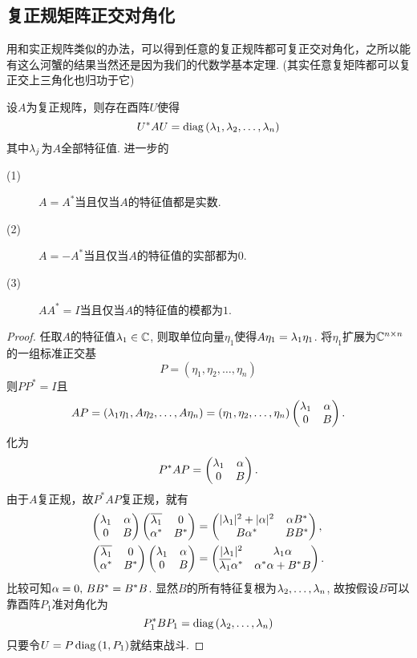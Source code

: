 \subsection{复正规矩阵正交对角化}
用和实正规阵类似的办法，可以得到任意的复正规阵都可复正交对角化，之所以能有这么河蟹的结果当然还是因为我们的代数学基本定理. (其实任意复矩阵都可以复正交上三角化也归功于它)
\begin{thm}
	设$A$为复正规阵，则存在酉阵$U$使得
	\[U^* AU=\operatorname*{diag\,}(\lambda_1,\lambda_2,\dots,\lambda_n)\]
	其中$\lambda_j$为$A$全部特征值. 进一步的
	\begin{description}
	\item[(1)] $A=A^*$当且仅当$A$的特征值都是实数.
	\item[(2)] $A=-A^*$当且仅当$A$的特征值的实部都为$0$.
	\item[(3)] $AA^*=I$当且仅当$A$的特征值的模都为$1$.
	\end{description}
\end{thm}
\begin{proof}
	任取$A$的特征值$\lambda_1\in\mathbb{C}$, 则取单位向量$\eta_1$使得$A\eta_1=\lambda_1 \eta_1$. 将$\eta_1$扩展为$\mathbb{C}^{n\times n}$的一组标准正交基
	\[P=(\eta_1,\eta_2,\dots,\eta_n)\]
	则$PP^*=I$且
	\[AP=(\lambda_1\eta_1,A\eta_2,\dots,A\eta_n)=(\eta_1,\eta_2,\dots,\eta_n)
	\begin{pmatrix} \lambda_1 & \alpha\\ 0 & B\end{pmatrix}.\]
	化为
	\[
	P^* AP=\begin{pmatrix} \lambda_1 & \alpha\\ 0 & B\end{pmatrix}.
	\]
	由于$A$复正规，故$P^* AP$复正规，就有
	\begin{align*}
	\begin{pmatrix} \lambda_1 & \alpha\\ 0 & B\end{pmatrix}
	\begin{pmatrix} \overline{\lambda_1} & 0\\ \alpha^* & B^*\end{pmatrix}&=
		\begin{pmatrix} |\lambda_1|^2+|\alpha|^2 & \alpha B^*\\ B\alpha^* & BB^*\end{pmatrix},\\
	\begin{pmatrix} \overline{\lambda_1} & 0\\ \alpha^* & B^*\end{pmatrix}
	\begin{pmatrix} \lambda_1 & \alpha\\ 0 & B\end{pmatrix}&=
	\begin{pmatrix} |\lambda_1|^2 & \lambda_1\alpha\\ \overline{\lambda_1}\alpha^* & \alpha^*\alpha+B^* B\end{pmatrix}.
	\end{align*}
	比较可知$\alpha=0,\, BB^*=B^*B$. 显然$B$的所有特征复根为$\lambda_{2},\dots,\lambda_{n}$,
	故按假设$B$可以靠酉阵$P_1$准对角化为
	\[P_1^* B P_1=\operatorname*{diag\,}(\lambda_2,\dots,\lambda_n)\]
	只要令$U=P\operatorname*{diag\,}(1,P_1)$就结束战斗.
\end{proof}
